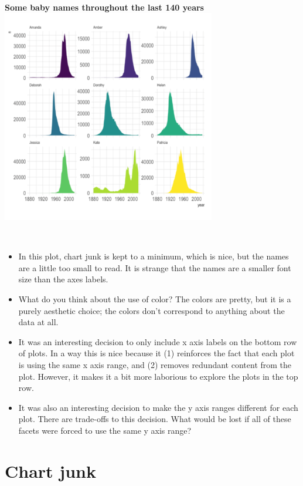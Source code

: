 \documentclass[
]{book}
\begin{document}
~\\

\textbf{Some baby names throughout the last 140 years}
\includegraphics[width=0.7\textwidth,height=\textheight]{img/visg.png}

~

\begin{itemize}
\item
  In this plot, chart junk is kept to a minimum, which is nice, but the names are a little too small to read. It is strange that the names are a smaller font size than the axes labels.
\item
  What do you think about the use of color? The colors are pretty, but it is a purely aesthetic choice; the colors don't correspond to anything about the data at all.
\item
  It was an interesting decision to only include x axis labels on the bottom row of plots. In a way this is nice because it (1) reinforces the fact that each plot is using the same x axis range, and (2) removes redundant content from the plot. However, it makes it a bit more laborious to explore the plots in the top row.
\item
  It was also an interesting decision to make the y axis ranges different for each plot. There are trade-offs to this decision. What would be lost if all of these facets were forced to use the same y axis range?
\end{itemize}

\hypertarget{chart-junk}{%
\section*{Chart junk}\label{chart-junk}}
\end{document}

